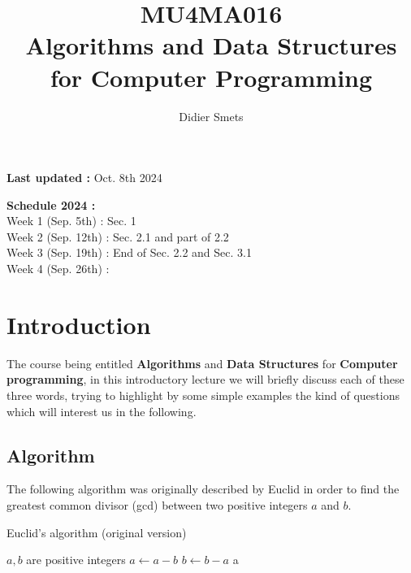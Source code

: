 \documentclass[12pt]{article}
\title{MU4MA016\\Algorithms and Data Structures\\for Computer Programming}
\author{Didier Smets}
\date{}
\theoremstyle{plain}
\theoremstyle{remark}
\begin{document}
\maketitle

\noindent 
{\bf Last updated :} Oct. 8th 2024

\medskip

\noindent
{\bf Schedule 2024 :}\\
Week 1 (Sep. 5th)  : Sec. 1\\
Week 2 (Sep. 12th) : Sec. 2.1 and part of 2.2\\
Week 3 (Sep. 19th) : End of Sec. 2.2 and Sec. 3.1\\
Week 4 (Sep. 26th) : 

\tableofcontents

\pagebreak

\section{Introduction}

The course being entitled {\bf Algorithms} and {\bf Data Structures} for {\bf
Computer programming}, in this introductory lecture we will briefly discuss each 
of these three words, trying to highlight by some simple examples the kind of
questions which will interest us in the following.

\subsection{Algorithm}

The following algorithm was originally described by Euclid in order to find
the greatest common divisor (gcd) between two positive integers $a$ and $b$.

\begin{algorithm}[H]
\caption{Euclid's algorithm (original version)}
\begin{algorithmic}
\Require $a, b$ are positive integers
\State $a \gets a - b$
\Else{}
\State $b \gets b - a$
\EndIf
\EndWhile
\State \Return a
\EndFunction
\end{algorithmic}
\end{algorithm}
\end{document}
